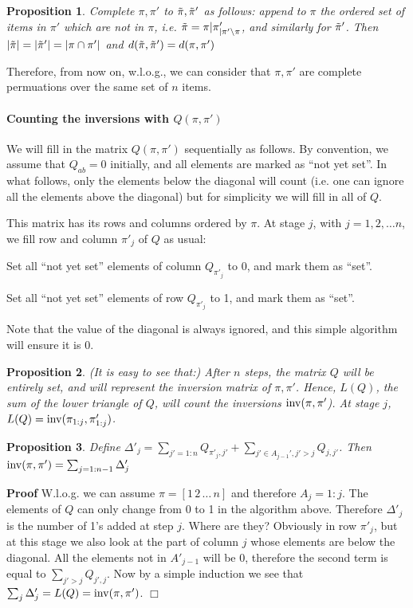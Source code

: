 \documentclass[10pt]{article}
\newtheorem{prop}{Proposition}
\begin{document}
\begin{prop}
  Complete $\pi,\pi'$ to $\tilde{\pi},\tilde{\pi}'$ as follows: append to $\pi$ the ordered set of items in $\pi'$ which are not in $\pi$, i.e. $\tilde{\pi}=\pi|\pi'_{|\pi'\setminus\pi}$, and similarly for $\tilde{\pi}'$. Then $|\tilde{\pi}|=|\tilde{\pi}'|=|\pi \cap \pi'|$ and $d(\tilde{\pi},\tilde{\pi}')=d(\pi,\pi')$
\end{prop}

Therefore, from now on, w.l.o.g., we can consider that $\pi,\pi'$ are complete permuations over the same set of $n$ items.

\paragraph{Counting the inversions with $Q(\pi,\pi')$}
We will fill in the matrix $Q(\pi,\pi')$ sequentially as follows.  By convention, we assume that $Q_{ab}=0$ initially, and all elements are marked as ``not yet set''. In what follows, only the elements below the diagonal will count (i.e. one can ignore all the elements above the diagonal) but for simplicity we will fill in all of $Q$. 


This matrix has its rows and columns ordered by $\pi$. At stage $j$, with $j=1,2,\ldots n$, we fill row and column $\pi'_j$ of $Q$ as usual:
\bit
\item Set all ``not yet set'' elements of column $Q_{\pi'_j}$ to 0, and mark them as ``set''.
\item Set all ``not yet set'' elements of row $Q_{\pi'_j}$ to 1, and mark them as ``set''.
\item Note that the value of the diagonal is always ignored, and this simple algorithm will ensure it is 0.
\eit

\begin{prop}
(It is easy to see that:) After $n$ steps, the matrix $Q$ will be entirely set, and will represent the inversion matrix of $\pi,\pi'$. Hence, $L(Q)$, the sum of the lower triangle of $Q$, will count the inversions $\operatorname{inv}(\pi,\pi'$).  At stage $j$, $L(Q)=\operatorname{inv}(\pi_{1:j},\pi'_{1:j})$. 
\end{prop}

\begin{prop}
Define $\Delta'_j=\sum_{j'=1:n}Q_{\pi'_j,j'}+\sum_{j'\in A_{j-1}', j'>j}Q_{j,j'}$. Then $\operatorname{inv}(\pi,\pi')=\sum_{j=1:n-1}\Delta'_j$
\end{prop}
{\bf Proof} W.l.o.g. we can assume $\pi=[1\,2\,\ldots\,n]$ and
therefore $A_j=1:j$. The elements of $Q$ can only change from 0 to 1
in the algorithm above. Therefore $\Delta'_j$ is the number of 1's
added at step $j$. Where are they? Obviously in row $\pi'_j$, but at
this stage we also look at the part of column $j$ whose elements are
below the diagonal. All the elements not in $A'_{j-1}$ will be 0,
therefore the second term is equal to $\sum_{j'>j}Q_{j',j}$.  Now by a
simple induction we see that
$\sum_j\Delta'_j=L(Q)=\operatorname{inv}(\pi,\pi')$. $\Box$
\end{document}

